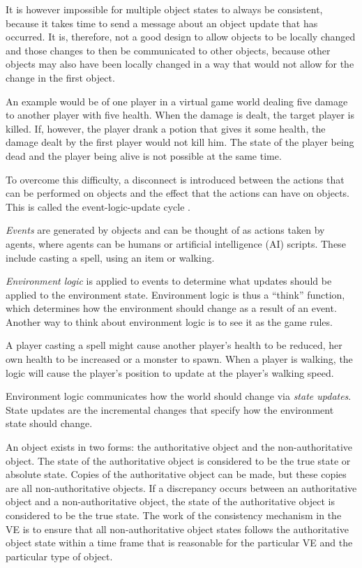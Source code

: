 It is however impossible for multiple object states to always be consistent, because it takes time to send a message about an object update that has occurred. It is, therefore, not a good design to allow objects to be locally changed and those changes to then be communicated to other objects, because other objects may also have been locally changed in a way that would not allow for the change in the first object.

An example would be of one player in a virtual game world dealing five damage to another player with five health. When the damage is dealt, the target player is killed. If, however, the player drank a potion that gives it some health, the damage dealt by the first player would not kill him. The state of the player being dead and the player being alive is not possible at the same time.

To overcome this difficulty, a disconnect is introduced between the actions that can be performed on objects and the effect that the actions can have on objects. This is called the event-logic-update cycle \cite{}.

\emph{Events} are generated by objects and can be thought of as actions taken by agents, where agents can be humans or artificial intelligence (AI) scripts. These include casting a spell, using an item or walking.

\emph{Environment logic} is applied to events to determine what updates should be applied to the environment state. Environment logic is thus a ``think'' function, which determines how the environment should change as a result of an event. Another way to think about environment logic is to see it as the game rules.

A player casting a spell might cause another player's health to be reduced, her own health to be increased or a monster to spawn. When a player is walking, the logic will cause the player's position to update at the player's walking speed.

Environment logic communicates how the world should change via \emph{state updates}. State updates are the incremental changes that specify how the environment state should change.

An object exists in two forms: the authoritative object and the non-authoritative object. The state of the authoritative object is considered to be the true state or absolute state. Copies of the authoritative object can be made, but these copies are all non-authoritative objects. If a discrepancy occurs between an authoritative object and a non-authoritative object, the state of the authoritative object is considered to be the true state. The work of the consistency mechanism in the VE is to ensure that all non-authoritative object states follows the authoritative object state within a time frame that is reasonable for the particular VE and the particular type of object.

